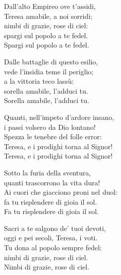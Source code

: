 
\strofa Dall'alto Empireo ove t'assidi,\\
Teresa amabile, a noi sorridi;\\
nimbi di grazie, rose di ciel:\\
spargi sul popolo a te fedel.\\
Spargi sul popolo a te fedel.

\spazio

\strofa Dalle battaglie di questo esilio,\\
vede l'insidia teme il periglio;\\
a la vittoria teco lassù:\\
sorella amabile, l'adduci tu.\\
Sorella amabile, l'adduci tu.

\spazio

\strofa Quanti, nell'impeto d'ardore insano,\\
i passi volsero da Dio lontano!\\
Spezza le tenebre del folle error:\\
Teresa, e i prodighi torna al Signor!\\
Teresa, e i prodighi torna al Signor!

\spazio

\strofa Sotto la furia della sventura,\\
quanti trascorrono la vita dura!\\
Ai cuori che giacciono proni nel duol:\\
fa tu risplendere di gioia il sol.\\
Fa tu risplendere di gioia il sol.

\spazio

\strofa Sacri a te salgono de' tuoi devoti,\\
oggi e pei secoli, Teresa, i voti.\\
Tu dona al popolo sempre fedel:\\
nimbi di grazie, rose di ciel.\\
Nimbi di grazie, rose di ciel.